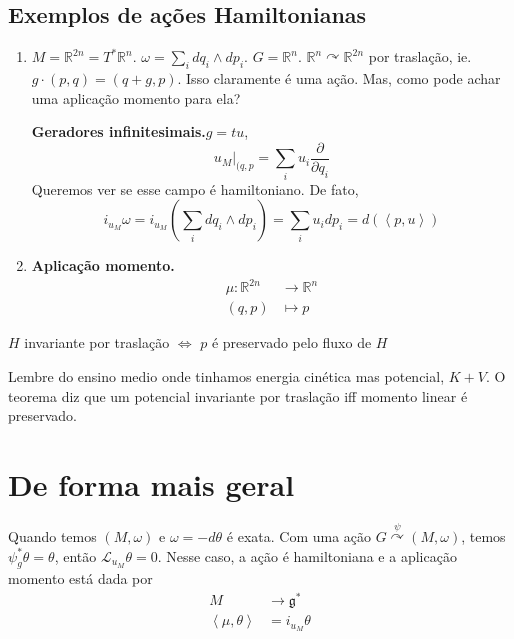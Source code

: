 \subsection{Exemplos de ações Hamiltonianas}

\begin{enumerate}
	\item $M=\mathbb{R}^{2n}=T^*\mathbb{R}^{n}$. $\omega=\sum_{i}dq_i\wedge dp_i$. $G=\mathbb{R}^{n}$. $\mathbb{R}^{n}\curvearrowright \mathbb{R}^{2n}$ por traslação, ie. $g\cdot(p,q)=(q+g,p)$. Isso claramente é uma ação. Mas, como pode achar uma aplicação momento para ela?

		{\color{4}\bfseries Geradores infinitesimais.}\hspace{.5em}$g=tu$,
		\[u_{M}|_{(q,p}=\sum_{i}u_i \frac{\partial }{\partial q_i}\]
		Queremos ver se esse campo é hamiltoniano. De fato,
		\[i_{u_M}\omega=i_{u_M}\left( \sum_{i}dq_i\wedge dp_i \right) =\sum_{i}u_i dp_i=d \left( \left<p,u\right>  \right) \]

	\item  {\color{4}\bfseries Aplicação momento.}\hspace{.5em}
\begin{align*}
	\mu: \mathbb{R}^{2n} &\longrightarrow \mathbb{R}^{n} \\
	(q,p) &\longmapsto p
\end{align*}

\end{enumerate}

\begin{thm}[Noether]\leavevmode
	$H$ invariante por traslação $\iff$ $p$ é preservado pelo fluxo de $H$
\end{thm}

\begin{remark}\leavevmode
	Lembre do ensino medio onde tinhamos energia cinética mas potencial, $K+V$.  O teorema diz que um potencial invariante por traslação iff momento linear é preservado.
\end{remark}

\section{De forma mais geral}

Quando temos $(M,\omega)$ e $\omega=-d\theta$ é exata. Com uma ação $G\overset{\psi}{\curvearrowright}(M,\omega)$, temos $\psi_g^*\theta=\theta$, então $\mathcal{L}_{u_{M}}\theta=0$. Nesse caso, a ação é hamiltoniana e a aplicação momento está dada por
\begin{align*}
	M &\longrightarrow \mathfrak{g}^* \\
	\left<\mu,\theta\right>  &=i_{u_{M}}\theta
\end{align*}

